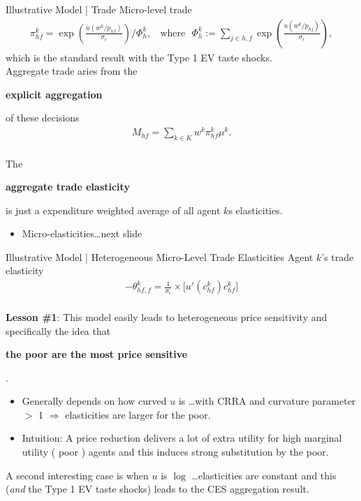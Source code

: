 \documentclass[9pt,pdftex,aspectratio=1610]{beamer}
\theoremstyle{definition}
\begin{document}
\begin{frame}[t]{Illustrative Model | Trade}
\smallskip
Micro-level trade
\begin{align*}
\pi_{hf}^k = \exp \left( \frac{ u( w^k / p_{hf} ) }{\sigma_{\epsilon}} \right) \Bigg / \Phi_{h}^k, \ \ \ \ \mbox{where} \ \ \ \Phi_{h}^k := \sum_{j\in {h,f}} \exp \left( \frac{ u( w^k / p_{hj} )  }{\sigma_{\epsilon}} \right),
\end{align*}
which is the standard result with the Type 1 EV taste shocks.\\
\bigskip
\medskip
Aggregate trade aries from the \begin{alert}{\textbf{explicit aggregation}}\end{alert} of these decisions
\begin{align*}
M_{hf} = \sum\limits_{k\in K} w^k \pi_{hf}^k \mu^k.
\end{align*}\\
\bigskip
The \begin{alert}{\textbf{aggregate trade elasticity}}\end{alert} is just a expenditure weighted average of all agent $k$s elasticities.
\begin{itemize}
\item Micro-elasticities\ldots next slide
\end{itemize}
\end{frame}


\begin{frame}[t]{Illustrative Model | Heterogeneous Micro-Level Trade Elasticities}
\smallskip
Agent $k$'s trade elasticity
\begin{align*}
-\theta_{hf,f}^k = \frac{1}{\sigma_{\epsilon}} \times \bigg[ u'( c_{hf}^k )c_{hf}^k \bigg]
\end{align*}\\
\bigskip
\textbf{Lesson \#1}: This model easily leads to heterogeneous price sensitivity and specifically the idea that \begin{alert}{\textbf{the poor are the most price sensitive}}\end{alert}.
\begin{itemize}
\smallskip
\item Generally depends on how curved $u$ is \ldots with CRRA and curvature parameter $>$ 1 $\Rightarrow$ elasticities are larger for the poor.
\smallskip
\item Intuition: A price reduction delivers a lot of extra utility for high marginal utility ( poor ) agents and this induces strong substitution by the poor.
\end{itemize}
\bigskip
A second interesting case is when $u$ is $\log$ \ldots elasticities are constant and this (\emph{and} the Type 1 EV taste shocks) leads to the {\small \citet{anderson1987ces}} CES aggregation result.
\end{frame}
\end{document}
